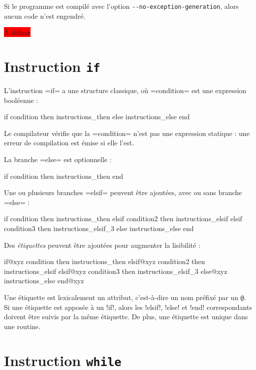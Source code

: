 Si le programme est compilé avec l'option \texttt{-{}-no-exception-generation}, alors aucun code n'est engendré.





\colorbox{red}{À définir}


\section{Instruction \texttt{if}}

L'instruction \plm=if= a une structure classique, où \plm=condition= est une expression booléenne :
\begin{PLM}
if condition then
  instructions_then
else
  instructions_else
end
\end{PLM}

Le compilateur vérifie que la \plm=condition= n'est pas une expression statique : une erreur de compilation est émise si elle l'est.

La branche \plm=else= est optionnelle :
\begin{PLM}
if condition then
  instructions_then
end
\end{PLM}


Une ou plusieurs branches \plm=elsif= peuvent être ajoutées, avec ou sans branche \plm=else= :
\begin{PLM}
if condition then
  instructions_then
elsif condition2 then
  instructions_elsif
elsif condition3 then
  instructions_elsif_3
else
  instructions_else
end
\end{PLM}


Des \emph{étiquettes} peuvent être ajoutées pour augmenter la lisibilité :
\begin{PLM}
if@xyz condition then
  instructions_then
elsif@xyz condition2 then
  instructions_elsif
elsif@xyz condition3 then
  instructions_elsif_3
else@xyz
  instructions_else
end@xyz
\end{PLM}

Une étiquette est lexicalement un attribut, c'est-à-dire un nom préfixé par un \texttt{@}. Si une étiquette est apposée à un \plm!if!, alors les \plm!elsif!, \plm!else! et \plm!end! correspondants doivent être suivis par la même étiquette. De plus, une étiquette est unique dans une routine.


\section{Instruction \texttt{while}}

